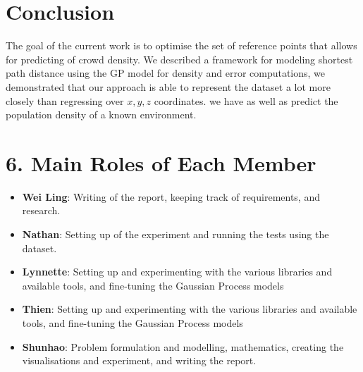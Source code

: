 \documentclass[letterpaper]{article}
\begin{document}
\section{Conclusion}

The goal of the current work is to optimise the set of reference points that allows for predicting of crowd density. We described a framework for modeling shortest path distance using the GP model for density and error computations, we demonstrated that our approach is able to represent the dataset a lot more closely than regressing over $x,y,z$ coordinates. we have as well as predict the population density of a known environment.

\section{6. Main Roles of Each Member}
\begin{itemize}
\item \textbf{Wei Ling}: 
Writing of the report, keeping track of requirements, and research.
\item \textbf{Nathan}: 
Setting up of the experiment and running the tests using the dataset.
\item \textbf{Lynnette}: 
Setting up and experimenting with the various libraries and available tools, and fine-tuning the Gaussian Process models
\item \textbf{Thien}: 
Setting up and experimenting with the various libraries and available tools, and fine-tuning the Gaussian Process models
\item \textbf{Shunhao}: 
Problem formulation and modelling, mathematics, creating the visualisations and experiment, and writing the report.
\end{itemize}



\end{document}

